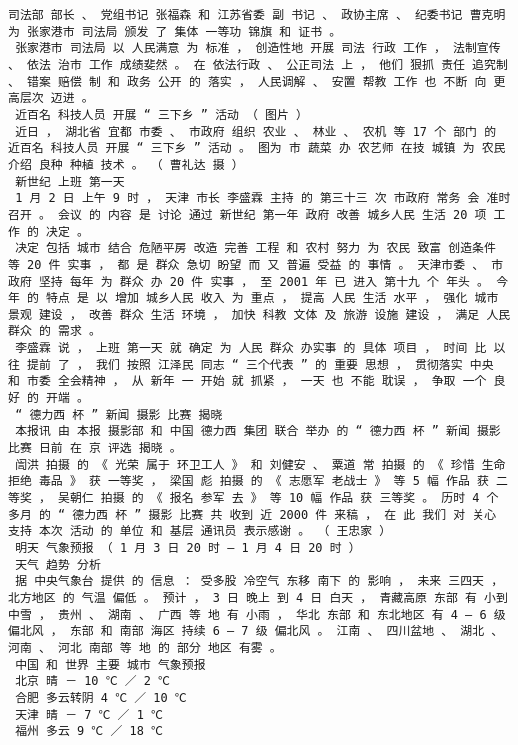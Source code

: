 \documentclass{article}
\begin{document}
\begin{Verbatim}[commandchars=\\\{\}]
 司法部 部长 、 党组书记 张福森 和 江苏省委 副 书记 、 政协主席 、 纪委书记 曹克明 为 张家港市 司法局 颁发 了 集体 一等功 锦旗 和 证书 。 
 张家港市 司法局 以 人民满意 为 标准 ， 创造性地 开展 司法 行政 工作 ， 法制宣传 、 依法 治市 工作 成绩斐然 。 在 依法行政 、 公正司法 上 ， 他们 狠抓 责任 追究制 、 错案 赔偿 制 和 政务 公开 的 落实 ， 人民调解 、 安置 帮教 工作 也 不断 向 更 高层次 迈进 。 
 近百名 科技人员 开展 “ 三下乡 ” 活动 （ 图片 ） 
 近日 ， 湖北省 宜都 市委 、 市政府 组织 农业 、 林业 、 农机 等 17 个 部门 的 近百名 科技人员 开展 “ 三下乡 ” 活动 。 图为 市 蔬菜 办 农艺师 在技 城镇 为 农民 介绍 良种 种植 技术 。 （ 曹礼达 摄 ） 
 新世纪 上班 第一天 
 1 月 2 日 上午 9 时 ， 天津 市长 李盛霖 主持 的 第三十三 次 市政府 常务 会 准时 召开 。 会议 的 内容 是 讨论 通过 新世纪 第一年 政府 改善 城乡人民 生活 20 项 工作 的 决定 。 
 决定 包括 城市 结合 危陋平房 改造 完善 工程 和 农村 努力 为 农民 致富 创造条件 等 20 件 实事 ， 都 是 群众 急切 盼望 而 又 普遍 受益 的 事情 。 天津市委 、 市政府 坚持 每年 为 群众 办 20 件 实事 ， 至 2001 年 已 进入 第十九 个 年头 。 今年 的 特点 是 以 增加 城乡人民 收入 为 重点 ， 提高 人民 生活 水平 ， 强化 城市 景观 建设 ， 改善 群众 生活 环境 ， 加快 科教 文体 及 旅游 设施 建设 ， 满足 人民 群众 的 需求 。 
 李盛霖 说 ， 上班 第一天 就 确定 为 人民 群众 办实事 的 具体 项目 ， 时间 比 以往 提前 了 ， 我们 按照 江泽民 同志 “ 三个代表 ” 的 重要 思想 ， 贯彻落实 中央 和 市委 全会精神 ， 从 新年 一 开始 就 抓紧 ， 一天 也 不能 耽误 ， 争取 一个 良好 的 开端 。 
 “ 德力西 杯 ” 新闻 摄影 比赛 揭晓 
 本报讯 由 本报 摄影部 和 中国 德力西 集团 联合 举办 的 “ 德力西 杯 ” 新闻 摄影 比赛 日前 在 京 评选 揭晓 。 
 訚洪 拍摄 的 《 光荣 属于 环卫工人 》 和 刘健安 、 粟道 常 拍摄 的 《 珍惜 生命 拒绝 毒品 》 获 一等奖 ， 梁国 彪 拍摄 的 《 志愿军 老战士 》 等 5 幅 作品 获 二等奖 ， 吴朝仁 拍摄 的 《 报名 参军 去 》 等 10 幅 作品 获 三等奖 。 历时 4 个 多月 的 “ 德力西 杯 ” 摄影 比赛 共 收到 近 2000 件 来稿 ， 在 此 我们 对 关心 支持 本次 活动 的 单位 和 基层 通讯员 表示感谢 。 （ 王忠家 ） 
 明天 气象预报 （ 1 月 3 日 20 时 — 1 月 4 日 20 时 ） 
 天气 趋势 分析 
 据 中央气象台 提供 的 信息 ： 受多股 冷空气 东移 南下 的 影响 ， 未来 三四天 ， 北方地区 的 气温 偏低 。 预计 ， 3 日 晚上 到 4 日 白天 ， 青藏高原 东部 有 小到中雪 ， 贵州 、 湖南 、 广西 等 地 有 小雨 ， 华北 东部 和 东北地区 有 4 — 6 级 偏北风 ， 东部 和 南部 海区 持续 6 — 7 级 偏北风 。 江南 、 四川盆地 、 湖北 、 河南 、 河北 南部 等 地 的 部分 地区 有雾 。 
 中国 和 世界 主要 城市 气象预报 
 北京 晴 － 10 ℃ ／ 2 ℃ 
 合肥 多云转阴 4 ℃ ／ 10 ℃ 
 天津 晴 － 7 ℃ ／ 1 ℃ 
 福州 多云 9 ℃ ／ 18 ℃ 

\end{Verbatim}
\end{document}
